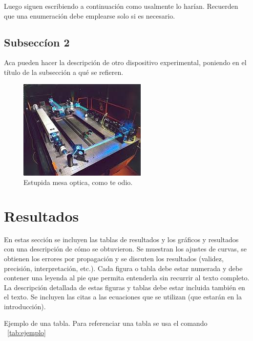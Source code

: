 \documentclass[twoside]{article}
\begin{document}
\begin{multicols}{2}
Luego siguen escribiendo a continuación como usalmente lo harían.
Recuerden que una enumeración debe emplearse solo si es necesario. %

\subsection{Subsecc\'ion 2}

Aca pueden hacer la descripción de otro dispositivo experimental, poniendo en el título de la subsección a qué se refieren.

\begin{figure}[H]
	\centering
	\includegraphics[scale=0.5]{./figs/mesaoptica.jpg}
	\caption{Estupida mesa optica, como te odio.}
	\label{fig:mesaoptica}
\end{figure}


\section{Resultados}

En estas sección se incluyen las tablas de resultados y los gráficos y resultados con una descripción de cómo se obtuvieron. Se muestran los ajustes de curvas, se obtienen los errores por propagación y se discuten los resultados (validez, precisión, interpretación, etc.). Cada figura o tabla debe estar numerada y debe contener una leyenda al pie que permita entenderla sin recurrir al texto completo. La descripción detallada de estas figuras y tablas debe estar incluida también en el texto. Se incluyen las citas a las ecuaciones que se utilizan (que estarán en la introducción).

Ejemplo de una tabla.
Para referenciar una tabla se usa el comando ~\ref{tab:ejemplo}


\end{multicols}
\end{document}
